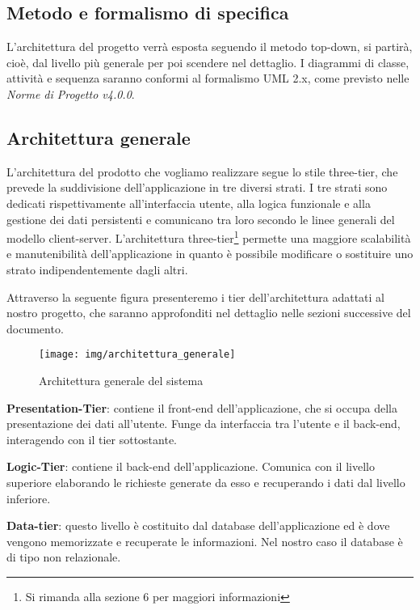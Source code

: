 \subsection{Metodo e formalismo di specifica}
L'architettura del progetto verrà esposta seguendo il metodo \gls{top-down}, si partirà, cioè, dal livello più generale per poi scendere nel dettaglio. I diagrammi di classe, attività e sequenza saranno conformi al formalismo \gls{UML} 2.x, come previsto nelle \textit{Norme di Progetto v4.0.0}.

\subsection{Architettura generale}
L'architettura del prodotto che vogliamo realizzare segue lo stile three-tier, che prevede la suddivisione dell'applicazione in tre diversi strati. I tre strati sono dedicati rispettivamente all'interfaccia utente, alla logica funzionale e alla gestione dei dati persistenti e comunicano tra loro secondo le linee generali del modello client-server. L'architettura three-tier\footnote{Si rimanda alla sezione 6 per maggiori informazioni} permette una maggiore scalabilità e manutenibilità dell'applicazione in quanto è possibile modificare o sostituire uno strato indipendentemente dagli altri.

Attraverso la seguente figura presenteremo i tier dell'architettura adattati al nostro progetto, che saranno approfonditi nel dettaglio nelle sezioni successive del documento.

\begin{figure}[h]
	\centering
	\texttt{[image: img/architettura\_generale]}
	\caption[Architettura generale del sistema]{Architettura generale del sistema}
\end{figure}

\textbf{Presentation-Tier}: contiene il \gls{front-end} dell'applicazione, che si occupa della presentazione dei dati all'utente. Funge da interfaccia tra l'utente e il \gls{back-end}, interagendo con il tier sottostante.

\textbf{Logic-Tier}: contiene il \gls{back-end} dell'applicazione. Comunica con il livello superiore elaborando le richieste generate da esso e recuperando i dati dal livello inferiore. 

\textbf{Data-tier}: questo livello è costituito dal \gls{database} dell'applicazione ed è dove vengono memorizzate e recuperate le informazioni. Nel nostro caso il \gls{database} è di tipo non relazionale.
